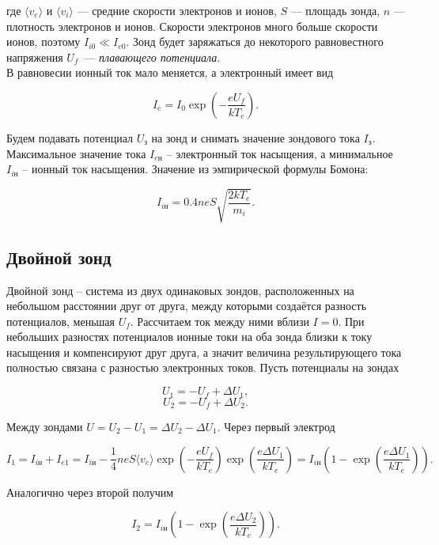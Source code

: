 \documentclass[a4paper]{article}
\theoremstyle{definition}
\theoremstyle{remark}
\begin{document}
где $\langle v_e \rangle$ и $\langle v_i \rangle$ --- средние скорости электронов и ионов, $S$ --- площадь зонда, $n$ --- плотность электронов и ионов. Скорости электронов много больше скорости ионов, поэтому $I_{i0} \ll I_{e0}$. Зонд будет заряжаться до некоторого равновестного напряжения $U_f$~--- \textit{плавающего потенциала}.\\

В равновесии ионный ток мало меняется, а электронный имеет вид

$$ I_e = I_0 \exp\left( -\dfrac{eU_f}{kT_e} \right). $$

Будем подавать потенциал $U_\text{з}$ на зонд и снимать значение зондового тока $I_\text{з}$. Максимальное значение тока $I_{e\text{н}}$ -- электронный ток насыщения, а минимальное $I_{i\text{н}}$ -- ионный ток насыщения. Значение из эмпирической формулы Бомона:

\begin{equation}
    I_{i\text{н}} = 0.4 neS \sqrt{\dfrac{2kT_e}{m_i}}.
\end{equation}

\subsection{Двойной зонд}

Двойной зонд -- система из двух одинаковых зондов, расположенных на небольшом расстоянии друг от друга, между которыми создаётся разность потенциалов, меньшая $U_f$. Рассчитаем ток между ними вблизи $I=0$. При небольших разностях потенциалов ионные токи на оба зонда близки к току насыщения и компенсируют друг друга, а значит величина результирующего тока полностью связана с разностью электронных токов. Пусть потенциалы на зондах

$$U_1 = -U_f + \Delta U_1, $$
$$ U_2 = -U_f + \Delta U_2. $$

Между зондами $U = U_2 - U_1 = \Delta U_2 - \Delta U_1$. Через первый электрод

\begin{equation}
    I_1 = I_{i\text{н}} + I_{e1} = I_{i\text{н}} - \dfrac{1}{4}neS\langle v_e\rangle \exp\left(-\dfrac{eU_f}{kT_e}\right)\exp\left(\dfrac{e\Delta U_1}{kT_e}\right)=I_{i\text{н}}\left(1 - \exp\left( \dfrac{e\Delta U_1}{kT_e} \right)\right).
\end{equation}


Аналогично через второй получим

\begin{equation}
    I_2 = I_{i\text{н}}\left(1 - \exp\left( \dfrac{e\Delta U_2}{kT_e} \right)\right).
\end{equation}
  
\end{document}
